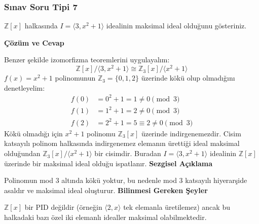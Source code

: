 \documentclass[11pt, a4paper]{article}
\newenvironment{cozum}{
    \vspace{0.5cm}
    \noindent\textcolor{green!60!black}{\faCheckCircle\enspace \textbf{\Large Çözüm ve Cevap}}\par\vspace{0.2cm}
}{}
\newenvironment{sezgisel}{
    \vspace{0.5cm}
    \noindent\textcolor{orange!80!black}{\faLightbulb\enspace \textbf{\Large Sezgisel Açıklama}}\par\vspace{0.2cm}
    \itshape
}{}
\newenvironment{bilgi}{
    \vspace{0.5cm}
    \noindent\textcolor{red!70!black}{\faExclamationTriangle\enspace \textbf{\Large Bilinmesi Gereken Şeyler}}\par\vspace{0.2cm}
}{}
\begin{document}
\subsubsection{Sınav Soru Tipi 7}
\begin{sinavbox}
$\mathbb{Z}[x]$ halkasında $I = \langle 3, x^2+1 \rangle$ idealinin maksimal ideal olduğunu gösteriniz.
\end{sinavbox}
\begin{cozum}
Benzer şekilde izomorfizma teoremlerini uygulayalım:
\[ \mathbb{Z}[x] / \langle 3, x^2+1 \rangle \cong \mathbb{Z}_3[x] / \langle x^2+1 \rangle \]
$f(x) = x^2+1$ polinomunun $\mathbb{Z}_3 = \{0, 1, 2\}$ üzerinde kökü olup olmadığını denetleyelim:
\begin{align*}
f(0) &= 0^2+1 = 1 \neq 0 \pmod 3 \\
f(1) &= 1^2+1 = 2 \neq 0 \pmod 3 \\
f(2) &= 2^2+1 = 5 \equiv 2 \neq 0 \pmod 3
\end{align*}
Kökü olmadığı için $x^2+1$ polinomu $\mathbb{Z}_3[x]$ üzerinde indirgenemezdir. Cisim katsayılı polinom halkasında indirgenemez elemanın ürettiği ideal maksimal olduğundan $\mathbb{Z}_3[x] / \langle x^2+1 \rangle$ bir cisimdir. Buradan $I = \langle 3, x^2+1 \rangle$ idealinin $\mathbb{Z}[x]$ üzerinde bir maksimal ideal olduğu ispatlanır.
\end{cozum}
\begin{sezgisel}
Polinomun mod 3 altında kökü yoktur, bu nedenle mod 3 katsayılı hiyerarşide asaldır ve maksimal ideal oluşturur.
\end{sezgisel}
\begin{bilgi}
$\mathbb{Z}[x]$ bir PID değildir (örneğin $\langle 2, x \rangle$ tek elemanla üretilemez) ancak bu halkadaki bazı özel iki elemanlı idealler maksimal olabilmektedir.
\end{bilgi}

\newpage
\end{document}
